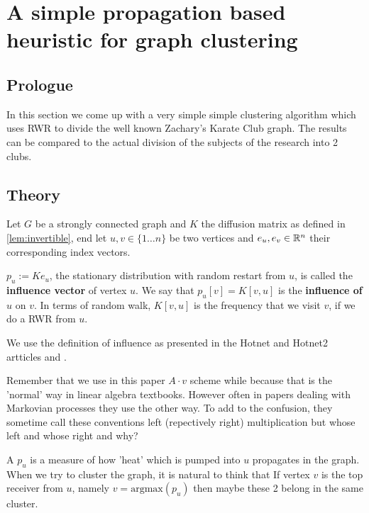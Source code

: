 \section{A simple propagation based heuristic for graph clustering}

\subsection*{Prologue}
In this section we come up with a very simple simple clustering
algorithm which uses RWR to divide the well known Zachary's Karate
Club graph. The results can be compared to the actual division of
the subjects of the research into 2 clubs.

\subsection*{Theory}

\begin{mydef}
\label{def:influence}
Let $G$ be a strongly connected graph and $K$ the diffusion matrix as defined in
\ref{lem:invertible}, end let $u,v \in \{1 \dots n\}$ be two vertices and $e_u,
e_v \in \mathbb{R}^n$ their corresponding index vectors.

$p_u := K e_u$, the stationary distribution with random restart from $u$,
is called the \textbf{influence vector} of vertex $u$. We say that
$p_u[v] = K[v,u]$
is the \textbf{influence of} $u$ on $v$. In terms of random walk,
$K[v,u]$ is the frequency that we visit $v$, if we do a RWR from
$u$. 
\end{mydef}

\begin{remark}
\label{rem:influence}
We use the definition of influence as presented in the Hotnet and
Hotnet2 artticles \cite{vandin2012discovery} and
\cite{leiserson2015pan}.

Remember that we use in this paper $A \cdot v$ scheme while
because that is the 'normal' way in linear algebra textbooks.
However often in papers dealing with Markovian processes they use
the other way. To add to the confusion, they sometime call these conventions
left (repectively right) multiplication but whose left and whose
right and why?
\end{remark}

A $p_u$ is a measure of how 'heat' which is pumped into $u$ propagates in the graph.
When we try to cluster the graph, it is natural to think that If vertex $v$
is the top receiver from $u$, namely $v = \text{argmax}(p_u)$ then maybe these 2
belong in the same cluster.

